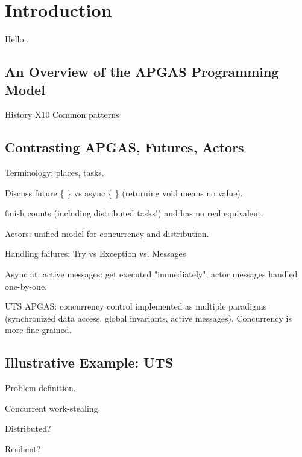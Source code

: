 \section{Introduction}

Hello \cite{TardieuETAL14X10ApgasAtPetascale}.

\subsection{An Overview of the APGAS Programming Model}
History
X10
Common patterns

\subsection{Contrasting APGAS, Futures, Actors}

Terminology: places, tasks.

Discuss future \{ \} vs async \{ \} (returning void means no value).

finish counts (including distributed tasks!) and has no real equivalent.

Actors: unified model for concurrency and distribution.

Handling failures: Try vs Exception vs. Messages

Async at: active messages: get executed "immediately", actor messages handled one-by-one.

UTS APGAS: concurrency control implemented as multiple paradigms (synchronized
data access, global invariants, active messages). Concurrency is more
fine-grained.


\subsection{Illustrative Example: UTS}

Problem definition.

Concurrent work-stealing.

Distributed?

Resilient?
